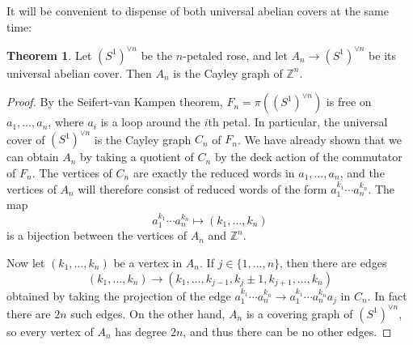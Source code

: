 \documentclass[10pt]{article}
\newcommand{\ZZ}{\mathbb{Z}}
\theoremstyle{definition}
\newtheorem{theorem}[lemma]{Theorem}
\begin{document}
It will be convenient to dispense of both universal abelian covers at the same time:
\begin{theorem}
Let $(S^1)^{\vee n}$ be the $n$-petaled rose, and let $A_n \to (S^1)^{\vee n}$ be its universal abelian cover.
Then $A_n$ is the Cayley graph of $\ZZ^n$.
\end{theorem}
\begin{proof}
By the Seifert-van Kampen theorem, $F_n = \pi((S^1)^{\vee n})$ is free on $a_1, \dots, a_n$, where $a_i$ is a loop around the $i$th petal.
In particular, the universal cover of $(S^1)^{\vee n}$ is the Cayley graph $C_n$ of $F_n$.
We have already shown that we can obtain $A_n$ by taking a quotient of $C_n$ by the deck action of the commutator of $F_n$.
The vertices of $C_n$ are exactly the reduced words in $a_1, \dots, a_n$, and the vertices of $A_n$ will therefore consist of reduced words of the form $a_1^{k_1} \cdots a_n^{k_n}$.
The map
$$a_1^{k_1} \cdots a_n^{k_n} \mapsto (k_1, \dots, k_n)$$
is a bijection between the vertices of $A_n$ and $\ZZ^n$.

Now let $(k_1, \dots, k_n)$ be a vertex in $A_n$.
If $j \in \{1, \dots, n\}$, then there are edges
$$(k_1, \dots, k_n) \to (k_1, \dots, k_{j-1}, k_j \pm 1, k_{j+1}, \dots, k_n)$$
obtained by taking the projection of the edge $a_1^{k_1} \cdots a_n^{k_n} \to a_1^{k_1} \cdots a_n^{k_n} a_j$ in $C_n$.
In fact there are $2n$ such edges.
On the other hand, $A_n$ is a covering graph of $(S^1)^{\vee n}$, so every vertex of $A_n$ has degree $2n$, and thus there can be no other edges.
\end{proof}
\end{document}
